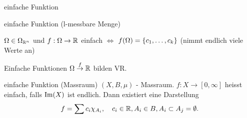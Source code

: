 \documentclass[class=article, crop=false]{standalone}
\begin{document}
\begin{zettel}{einfache Funktion}
\begin{flashcard}[vv6kcxgy]{einfache Funktion (l-messbare Menge)}
	\begin{definition}
		$\Omega \in  \Omega_{\mathbb{R}^n} $ und $f : \Omega \to  \mathbb{R} $ einfach $\iff $  $f(\Omega) = \set{ c_1,\dots,c_k}$ (nimmt endlich viele Werte an)
	\end{definition}

\end{flashcard}

\begin{lemma}
	Einfache Funktionen $\Omega \stackrel{f}{\to} \mathbb{R} $ bilden VR.
\end{lemma}

\begin{flashcard}[gzwhc7gp]{einfache Funktion (Massraum)}
	$(X,B,\mu)$ - Massraum. $f:X \to  [0, \infty] $ heisst einfach, falls $\operatorname{Im}(X)$ ist endlich. Dann existiert eine Darstellung
	\[
		f = \sum c_i \chi_{A_i}, \quad c_i \in \mathbb{R}, A_i \in B, A_i \subset  A_j = \emptyset
	.\]
\end{flashcard}

\end{zettel}
\end{document}

